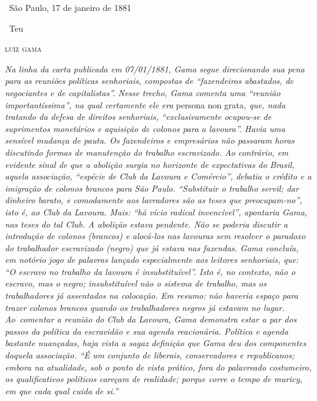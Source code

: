 \hfill\ São Paulo, 17 de janeiro de 1881

\hfill\ Teu

\hfill\textsc{luiz gama}


\begin{resumo}
\emph{Na linha da carta publicada em 07/01/1881, Gama segue direcionando
sua pena para as reuniões políticas senhoriais, compostas de
``fazendeiros abastados, de negociantes e de capitalistas''. Nesse trecho,
Gama comenta uma ``reunião importantíssima'', na qual certamente ele era}
persona non grata\emph{, que, nada tratando da defesa de direitos senhoriais,
``exclusivamente ocupou-se de suprimentos monetários e aquisição de
colonos para a lavoura''. Havia uma sensível mudança de pauta. Os
fazendeiros e empresários não passaram horas discutindo formas de
manutenção do trabalho escravizado. Ao contrário, em evidente sinal de
que a abolição surgia no horizonte de expectativas do Brasil, aquela
associação, ``espécie de Club da Lavoura e Comércio'', debatia o crédito e
a imigração de colonos brancos para São Paulo. ``Substituir o trabalho
servil; dar dinheiro barato, e comodamente aos lavradores são as teses
que preocupam-no'', isto é, ao Club da Lavoura. Mais: ``há vício radical
invencível'', apontaria Gama, nas teses do tal Club. A abolição estava
pendente. Não se poderia discutir a introdução de colonos (brancos) e
alocá-los nas lavouras sem resolver o paradoxo do trabalhador
escravizado (negro) que já estava nas fazendas. Gama concluía, em
notório jogo de palavras lançado especialmente aos leitores senhoriais,
que: ``O escravo no trabalho da lavoura é insubstituível''. Isto é, no
contexto, não o escravo, mas o negro; insubstituível não o sistema de
trabalho, mas os trabalhadores já assentados na colocação. Em resumo:
não haveria espaço para trazer colonos brancos quando os trabalhadores
negros já estavam no lugar. Ao~comentar a reunião do Club da Lavoura,
Gama demonstra estar a par dos passos da política da escravidão e sua
agenda reacionária. Política e agenda bastante nuançadas, haja vista a
sagaz definição que Gama deu dos componentes daquela associação. ``É um
conjunto de liberais, conservadores e republicanos; embora na
atualidade, sob o ponto de vista prático, fora do palavreado costumeiro,
os qualificativos políticos careçam de realidade; porque corre o tempo
de muricy, em que cada qual cuida de si.''}
\end{resumo}\pagebreak

